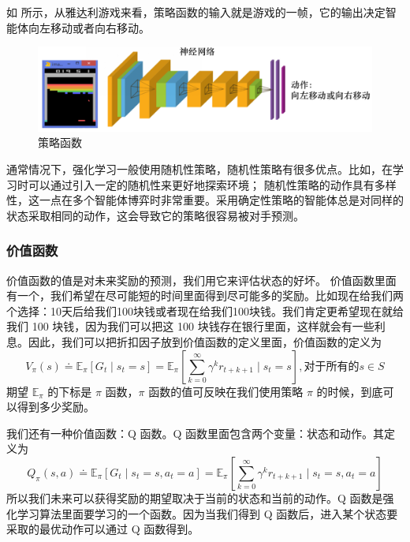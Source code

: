 如 所示，从雅达利游戏来看，策略函数的输入就是游戏的一帧，它的输出决定智能体向左移动或者向右移动。

\begin{figure}[htb]
    \centering
    \includegraphics[width=0.7\linewidth]{res/ch1/1.26}
    \caption{策略函数}
    \label{fig:polciy_function_atari}
\end{figure}

通常情况下，强化学习一般使用随机性策略，随机性策略有很多优点。比如，在学习时可以通过引入一定的随机性来更好地探索环境；
随机性策略的动作具有多样性，这一点在多个智能体博弈时非常重要。采用确定性策略的智能体总是对同样的状态采取相同的动作，这会导致它的策略很容易被对手预测。

\subsubsection{价值函数} 
价值函数的值是对未来奖励的预测，我们用它来评估状态的好坏。
价值函数里面有一个，我们希望在尽可能短的时间里面得到尽可能多的奖励。比如现在给我们两个选择：10天后给我们100块钱或者现在给我们100块钱。我们肯定更希望现在就给我们 100 块钱，因为我们可以把这 100 块钱存在银行里面，这样就会有一些利息。因此，我们可以把折扣因子放到价值函数的定义里面，价值函数的定义为
\begin{equation}
V_{\pi}(s) \doteq \mathbb{E}_{\pi}\left[G_{t} \mid s_{t}=s\right]=\mathbb{E}_{\pi}\left[\sum_{k=0}^{\infty} \gamma^{k} r_{t+k+1} \mid s_{t}=s\right], \text {对于所有的} s \in S
    \label{eq:value}
\end{equation}
期望 $\mathbb{E}_{\pi}$ 的下标是 $\pi$ 函数，$\pi$ 函数的值可反映在我们使用策略 $\pi$ 的时候，到底可以得到多少奖励。

我们还有一种价值函数：Q 函数。Q 函数里面包含两个变量：状态和动作。其定义为
\begin{equation}
    Q_{\pi}(s, a) \doteq \mathbb{E}_{\pi}\left[G_{t} \mid s_{t}=s, a_{t}=a\right]=\mathbb{E}_{\pi}\left[\sum_{k=0}^{\infty} \gamma^{k} r_{t+k+1} \mid s_{t}=s, a_{t}=a\right]
\end{equation}
所以我们未来可以获得奖励的期望取决于当前的状态和当前的动作。Q 函数是强化学习算法里面要学习的一个函数。因为当我们得到 Q 函数后，进入某个状态要采取的最优动作可以通过 Q 函数得到。


